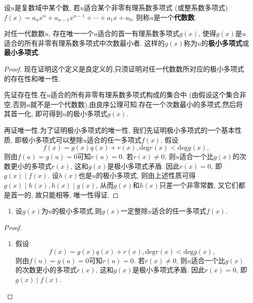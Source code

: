 \documentclass[../../main.tex]{subfiles}
\begin{document}
\begin{definition}[代数数]\label{definition:代数数}
设\(u\)是复数域中某个数, 若\(u\)适合某个非零有理系数多项式 (或整系数多项式)\(f(x)=a_nx^n + a_{n - 1}x^{n - 1}+\cdots+a_1x + a_0\), 则称\(u\)是一个\textbf{代数数}.
\end{definition}

\begin{definition}\label{definition:极小多项式(最小多项式)}
对任一代数数\(u\), 存在唯一一个\(u\)适合的首一有理系数多项式\(g(x)\), 使得\(g(x)\)是\(u\)适合的所有非零有理系数多项式中次数最小者. 这样的\(g(x)\)称为\(u\)的\textbf{极小多项式}或\textbf{最小多项式}.
\end{definition}
\begin{proof}
现在证明这个定义是良定义的,只须证明对任一代数数所对应的极小多项式的存在性和唯一性.

先证存在性.在\(u\)适合的所有非零有理系数多项式构成的集合中 (由假设这个集合非空,否则$u$就不是一个代数数),由良序公理可知,存在一个次数最小的多项式,然后将其首一化, 即可得到\(u\)的极小多项式\(g(x)\). 

再证唯一性.为了证明极小多项式的唯一性, 我们先证明极小多项式的一个基本性质, 即极小多项式可以整除\(u\)适合的任一多项式\(f(x)\). 假设
\[
f(x)=g(x)q(x)+r(x), \mathrm{deg }r(x)<\mathrm{deg }g(x),
\]
则由\(f(u)=g(u)=0\)可知\(r(u)=0\). 若\(r(x)\neq 0\), 则\(u\)适合一个比\(g(x)\)的次数更小的多项式\(r(x)\), 这和\(g(x)\)是极小多项式矛盾. 因此\(r(x)=0\), 即\(g(x)\mid f(x)\). 设\(h(x)\)也是\(u\)的极小多项式, 则由上述性质可得\(g(x)\mid h(x), h(x)\mid g(x)\), 从而\(g(x)\)和\(h(x)\)只差一个非零常数, 又它们都是首一的, 故只能相等, 唯一性得证.

\end{proof}

\begin{proposition}[极小多项式的基本性质]\label{proposition:极小多项式的基本性质}
\begin{enumerate}[(1)]
\item 设$g(x)$为$u$的极小多项式,则$g(x)$一定整除\(u\)适合的任一多项式\(f(x)\).
\end{enumerate}
\end{proposition}
\begin{proof}
\begin{enumerate}[(1)]
\item 假设
\[
f(x)=g(x)q(x)+r(x), \mathrm{deg }r(x)<\mathrm{deg }g(x),
\]
则由\(f(u)=g(u)=0\)可知\(r(u)=0\). 若\(r(x)\neq 0\), 则\(u\)适合一个比\(g(x)\)的次数更小的多项式\(r(x)\), 这和\(g(x)\)是极小多项式矛盾. 因此\(r(x)=0\), 即\(g(x)\mid f(x)\). 
\end{enumerate}

\end{proof}
\end{document}
